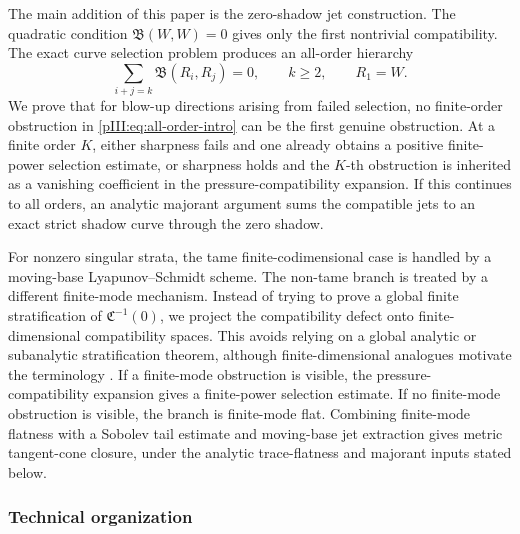 \documentclass[11pt]{article}
\numberwithin{equation}{section}
\theoremstyle{plain}
\theoremstyle{definition}
\theoremstyle{remark}
\newcommand{\calB}{\mathfrak B}
\newcommand{\calC}{\mathfrak C}
\begin{document}
The main addition of this paper is the zero-shadow jet construction.  The quadratic condition
\(\calB(W,W)=0\) gives only the first nontrivial compatibility.  The exact curve
selection problem produces an all-order hierarchy
\begin{equation}\label{pIII:eq:all-order-intro}
        \sum_{i+j=k}\calB(R_i,R_j)=0,
        \qquad k\ge2,
        \qquad R_1=W.
\end{equation}
We prove that for blow-up directions arising from failed selection, no finite-order
obstruction in \eqref{pIII:eq:all-order-intro} can be the first genuine obstruction.  At a
finite order \(K\), either sharpness fails and one already obtains a positive finite-power
selection estimate, or sharpness holds and the \(K\)-th obstruction is inherited as a
vanishing coefficient in the pressure-compatibility expansion.  If this continues to all
orders, an analytic majorant argument sums the compatible jets to an exact strict shadow
curve through the zero shadow.

For nonzero singular strata, the tame finite-codimensional case is handled by a
moving-base Lyapunov--Schmidt scheme.  The non-tame branch is treated by a different
finite-mode mechanism.  Instead of trying to prove a global finite stratification of
\(\calC^{-1}(0)\), we project the compatibility defect onto finite-dimensional
compatibility spaces.  This avoids relying on a global analytic or subanalytic stratification theorem, although finite-dimensional analogues motivate the terminology \cite{BierstoneMilman1988,Kurdyka1998,KrantzParks2002}.  If a finite-mode obstruction is visible, the pressure-compatibility
expansion gives a finite-power selection estimate.  If no finite-mode obstruction is
visible, the branch is finite-mode flat.  Combining finite-mode flatness with a Sobolev
tail estimate and moving-base jet extraction gives metric tangent-cone closure, under the
analytic trace-flatness and majorant inputs stated below.

\subsubsection*{Technical organization}
\end{document}
